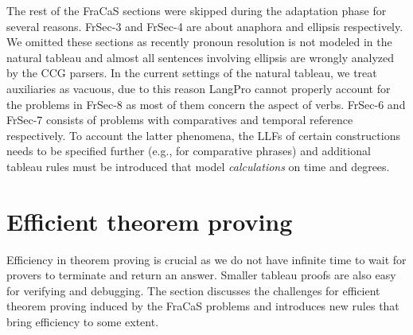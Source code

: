 \documentclass[11pt]{article}
\begin{document}
The rest of the FraCaS sections were skipped during the adaptation phase for several reasons.
FrSec-3 and FrSec-4 are about anaphora and ellipsis respectively.
We omitted these sections as recently pronoun resolution is not modeled in the natural tableau and almost all sentences involving ellipsis are wrongly analyzed by the CCG parsers.
In the current settings of the natural tableau, we treat auxiliaries as vacuous, due to this reason LangPro cannot properly account for the problems in FrSec-8 as most of them concern the aspect of verbs.
FrSec-6 and FrSec-7 consists of problems with comparatives and temporal reference respectively.
To account the latter phenomena, the LLFs of certain constructions needs to be specified further (e.g., for comparative phrases) and additional tableau rules must be introduced that model {\em calculations} on time and degrees.   





\section{Efficient theorem proving}
\label{sec:efficient}


Efficiency in theorem proving is crucial as we do not have infinite time to wait for provers to terminate and return an answer.
Smaller tableau proofs are also easy for verifying and debugging.
The section discusses the challenges for efficient theorem proving induced by the FraCaS problems and introduces new rules that bring efficiency to some extent.
 
\end{document}
